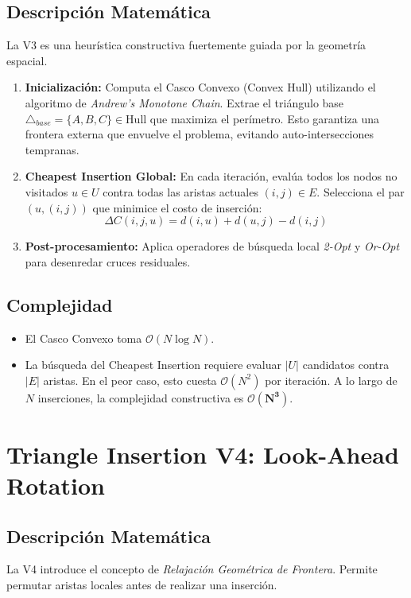 \documentclass[12pt, a4paper]{article}
\begin{document}
\subsection{Descripción Matemática}
La V3 es una heurística constructiva fuertemente guiada por la geometría espacial.
\begin{enumerate}
    \item \textbf{Inicialización:} Computa el Casco Convexo (Convex Hull) utilizando el algoritmo de \textit{Andrew's Monotone Chain}. Extrae el triángulo base $\triangle_{base} = \{A, B, C\} \in \text{Hull}$ que maximiza el perímetro. Esto garantiza una frontera externa que envuelve el problema, evitando auto-intersecciones tempranas.
    \item \textbf{Cheapest Insertion Global:} En cada iteración, evalúa todos los nodos no visitados $u \in U$ contra todas las aristas actuales $(i, j) \in E$. Selecciona el par $(u, (i,j))$ que minimice el costo de inserción:
    \[
    \Delta C(i, j, u) = d(i, u) + d(u, j) - d(i, j)
    \]
    \item \textbf{Post-procesamiento:} Aplica operadores de búsqueda local \textit{2-Opt} y \textit{Or-Opt} para desenredar cruces residuales.
\end{enumerate}

\subsection{Complejidad}
\begin{itemize}
    \item El Casco Convexo toma $\mathcal{O}(N \log N)$.
    \item La búsqueda del Cheapest Insertion requiere evaluar $|U|$ candidatos contra $|E|$ aristas. En el peor caso, esto cuesta $\mathcal{O}(N^2)$ por iteración. A lo largo de $N$ inserciones, la complejidad constructiva es $\mathbf{\mathcal{O}(N^3)}$.
\end{itemize}

\section{Triangle Insertion V4: Look-Ahead Rotation}

\subsection{Descripción Matemática}
La V4 introduce el concepto de \textit{Relajación Geométrica de Frontera}. Permite permutar aristas locales antes de realizar una inserción.
\end{document}
